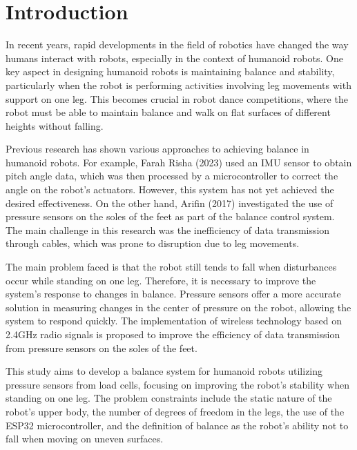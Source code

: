 \section{Introduction}
\label{sec:introduction}

In recent years, rapid developments in the field of robotics have changed the way humans interact with robots, especially in the context of humanoid robots\cite{chiang2020posture}. One key aspect in designing humanoid robots is maintaining balance and stability, particularly when the robot is performing activities involving leg movements with support on one leg. This becomes crucial in robot dance competitions, where the robot must be able to maintain balance and walk on flat surfaces of different heights without falling.

Previous research has shown various approaches to achieving balance in humanoid robots. For example, Farah Risha (2023)\cite{farah} used an IMU sensor to obtain pitch angle data, which was then processed by a microcontroller to correct the angle on the robot's actuators. However, this system has not yet achieved the desired effectiveness. On the other hand, Arifin (2017)\cite{arifin2017implementasi} investigated the use of pressure sensors on the soles of the feet as part of the balance control system. The main challenge in this research was the inefficiency of data transmission through cables, which was prone to disruption due to leg movements.

The main problem faced is that the robot still tends to fall when disturbances occur while standing on one leg. Therefore, it is necessary to improve the system's response to changes in balance. Pressure sensors offer a more accurate solution in measuring changes in the center of pressure on the robot, allowing the system to respond quickly. The implementation of wireless technology based on 2.4GHz radio signals is proposed to improve the efficiency of data transmission from pressure sensors on the soles of the feet.

This study aims to develop a balance system for humanoid robots utilizing pressure sensors from load cells, focusing on improving the robot's stability when standing on one leg. The problem constraints include the static nature of the robot's upper body, the number of degrees of freedom in the legs, the use of the ESP32 microcontroller, and the definition of balance as the robot's ability not to fall when moving on uneven surfaces.
